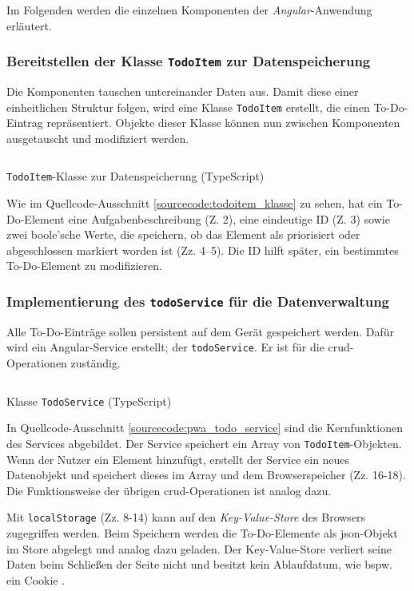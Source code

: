 Im Folgenden werden die einzelnen Komponenten der \textit{Angular}-Anwendung erläutert.
\subsubsection{Bereitstellen der Klasse \texttt{TodoItem} zur Datenspeicherung}

Die Komponenten tauschen untereinander Daten aus. Damit diese einer einheitlichen Struktur folgen, wird eine Klasse \texttt{TodoItem} erstellt, die einen To-Do-Eintrag repräsentiert. Objekte dieser Klasse können nun zwischen Komponenten ausgetauscht und modifiziert werden.

\begin{listing}[h!]
	\inputminted{TypeScript}{sourcecode/pwa_todoitem_klasse.js}
	\caption{\texttt{TodoItem}-Klasse zur Datenspeicherung (TypeScript)}
	\label{sourcecode:todoitem_klasse}
\end{listing}

Wie im Quellcode-Ausschnitt \ref{sourcecode:todoitem_klasse} zu sehen, hat ein To-Do-Element eine Aufgabenbeschreibung (Z. 2), eine eindeutige ID (Z. 3) sowie zwei boole'sche Werte, die speichern, ob das Element als priorisiert oder abgeschlossen markiert worden ist (Zz. 4--5). Die ID hilft später, ein bestimmtes To-Do-Element zu modifizieren.

\subsubsection{Implementierung des \texttt{todoService} für die Datenverwaltung}
Alle To-Do-Einträge sollen persistent auf dem Gerät gespeichert werden. Dafür wird ein Angular-Service erstellt; der \texttt{todoService}. Er ist für die \ac{crud}-Operationen zuständig.

\begin{listing}[h!]
	\inputminted{TypeScript}{sourcecode/pwa_todo_service.ts}
	\caption{Klasse \texttt{TodoService} (TypeScript)}
	\label{sourcecode:pwa_todo_service}
\end{listing}

In Quellcode-Ausschnitt \ref{sourcecode:pwa_todo_service} sind die Kernfunktionen des Services abgebildet. Der Service speichert ein Array von \texttt{TodoItem}-Objekten. Wenn der Nutzer ein Element hinzufügt, erstellt der Service ein neues Datenobjekt und speichert dieses im Array und dem Browserspeicher (Zz. 16-18). Die Funktionsweise der übrigen \ac{crud}-Operationen ist analog dazu.

Mit \texttt{localStorage} (Zz. 8-14) kann auf den \textit{Key-Value-Store} des Browsers zugegriffen werden. Beim Speichern werden die To-Do-Elemente als \ac{json}-Objekt im Store abgelegt und analog dazu geladen. Der Key-Value-Store verliert seine Daten beim Schließen der Seite nicht und besitzt kein Ablaufdatum, wie bspw. ein Cookie \cite{LocalStorage}.

